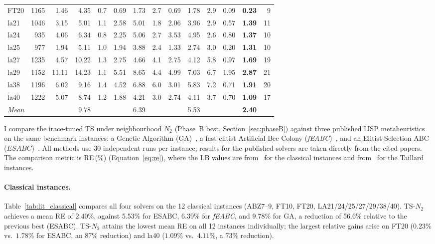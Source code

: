 \documentclass[preprint,12pt]{elsarticle}
\begin{document}
\begin{table}[!htb]
\begin{tabular}{l r | rr r | rr r | rr r | rr r}
FT20 & 1165 & 1.46 & 4.35 & 0.7 & 0.69 & 1.73 & 2.7 & 0.69 & 1.78 & 2.9 & 0.09 & \textbf{0.23} & 9 \\
la21 & 1046 & 3.15 & 5.01 & 1.1 & 2.58 & 5.01 & 1.8 & 2.06 & 3.96 & 2.9 & 0.57 & \textbf{1.39} & 11 \\
la24 & 935 & 4.06 & 6.34 & 0.8 & 2.25 & 5.06 & 2.7 & 3.53 & 4.95 & 2.6 & 0.80 & \textbf{1.37} & 10 \\
la25 & 977 & 1.94 & 5.11 & 1.0 & 1.94 & 3.88 & 2.4 & 1.33 & 2.74 & 3.0 & 0.20 & \textbf{1.31} & 10 \\
la27 & 1235 & 4.57 & 10.22 & 1.3 & 2.75 & 4.66 & 4.1 & 2.75 & 4.12 & 5.8 & 0.97 & \textbf{1.69} & 19 \\
la29 & 1152 & 11.11 & 14.23 & 1.1 & 5.51 & 8.65 & 4.4 & 4.99 & 7.03 & 6.7 & 1.95 & \textbf{2.87} & 21 \\
la38 & 1196 & 6.02 & 9.16 & 1.4 & 4.52 & 6.88 & 6.0 & 3.01 & 5.83 & 7.2 & 0.71 & \textbf{1.91} & 20 \\
la40 & 1222 & 5.07 & 8.74 & 1.2 & 1.88 & 4.21 & 3.0 & 2.74 & 4.11 & 3.7 & 0.70 & \textbf{1.09} & 17 \\
\hline
\textit{Mean} & & & 9.78 & & & 6.39 & & & 5.53 & & & \textbf{2.40} & \\
\hline
\end{tabular}
\end{table}

I compare the irace-tuned TS under neighbourhood $N_2$ (Phase~B best, Section~\ref{sec:phaseB}) against three published IJSP metaheuristics on the same benchmark instances: a Genetic Algorithm (GA)~\cite{DiazIPMU2020}, a fast-elitist Artificial Bee Colony (\emph{fEABC})~\cite{DiazFEABC2023}, and an Elitist-Selection ABC ($ESABC$)~\cite{DiazICAE2023}. All methods use 30 independent runs per instance; results for the published solvers are taken directly from the cited papers. The comparison metric is RE\,(\%) (Equation~\ref{eq:re}), where the LB values are from~\cite{DiazFEABC2023} for the classical instances and from~\cite{Taillard1993} for the Taillard instances.

\paragraph{Classical instances.}
Table~\ref{tab:lit_classical} compares all four solvers on the 12 classical instances (ABZ7--9, FT10, FT20, LA21/24/25/27/29/38/40). TS-$N_2$ achieves a mean RE of $\mathbf{2.40\%}$, against 5.53\% for ESABC, 6.39\% for \emph{fEABC}, and 9.78\% for GA, a reduction of 56.6\% relative to the previous best (ESABC). TS-$N_2$ attains the lowest mean RE on all 12 instances individually; the largest relative gains arise on FT20 ($0.23\%$ vs.\ $1.78\%$ for ESABC, an 87\% reduction) and la40 ($1.09\%$ vs.\ $4.11\%$, a 73\% reduction).
\end{document}
